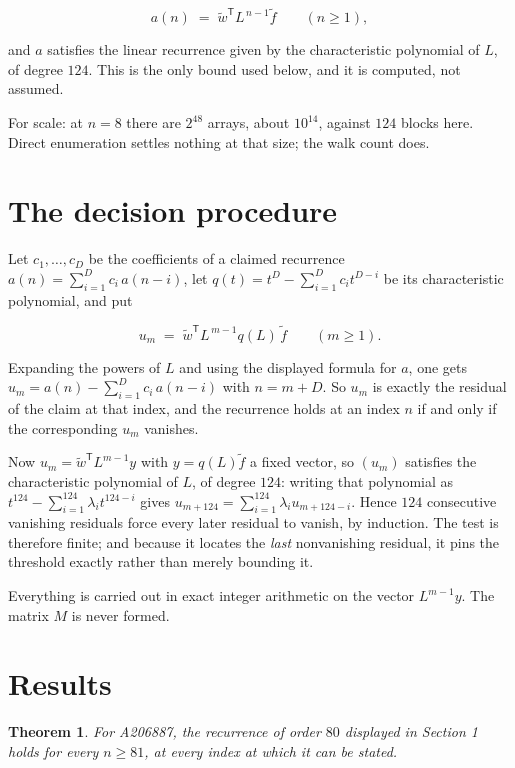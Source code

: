 \documentclass[11pt]{article}
\newtheorem{theorem}{Theorem}
\theoremstyle{definition}
\begin{document}
\[a(n) \;=\; \tilde w^{\mathsf T} L^{\,n-1} \tilde f \qquad (n \ge 1),\]

and $a$ satisfies the linear recurrence given by the characteristic polynomial of $L$, of degree $124$. This is the only bound used below, and it is computed, not assumed.

For scale: at $n = 8$ there are $2^{48}$ arrays, about $10^{14}$, against $124$ blocks here. Direct enumeration settles nothing at that size; the walk count does.

\section{The decision procedure}

Let $c_1,\dots,c_D$ be the coefficients of a claimed recurrence $a(n) = \sum_{i=1}^{D} c_i\,a(n-i)$, let $q(t) = t^{D} - \sum_{i=1}^{D} c_i t^{D-i}$ be its characteristic polynomial, and put

\[u_m \;=\; \tilde w^{\mathsf T} L^{\,m-1} q(L)\,\tilde f \qquad (m \ge 1).\]

Expanding the powers of $L$ and using the displayed formula for $a$, one gets $u_m = a(n) - \sum_{i=1}^{D} c_i\,a(n-i)$ with $n = m + D$. So $u_m$ is exactly the residual of the claim at that index, and the recurrence holds at an index $n$ if and only if the corresponding $u_m$ vanishes.

Now $u_m = \tilde w^{\mathsf T} L^{m-1} y$ with $y = q(L)\tilde f$ a fixed vector, so $(u_m)$ satisfies the characteristic polynomial of $L$, of degree $124$: writing that polynomial as $t^{124} - \sum_{i=1}^{124} \lambda_i t^{124-i}$ gives $u_{m+124} = \sum_{i=1}^{124} \lambda_i u_{m+124-i}$. Hence $124$ consecutive vanishing residuals force every later residual to vanish, by induction. The test is therefore finite; and because it locates the {\itshape last} nonvanishing residual, it pins the threshold exactly rather than merely bounding it.

Everything is carried out in exact integer arithmetic on the vector $L^{m-1}y$. The matrix $M$ is never formed.

\section{Results}

\begin{theorem} For A206887, the recurrence of order $80$ displayed in Section 1 holds for every $n \ge 81$, at every index at which it can be stated.\end{theorem}
\end{document}
